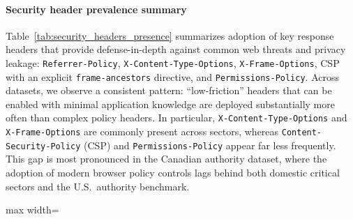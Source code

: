 \documentclass[a4paper,fleqn]{cas-sc}
\begin{document}
\paragraph{Security header prevalence summary}
    Table~\ref{tab:security_headers_presence} summarizes adoption of key response headers that provide defense-in-depth against common web threats and privacy leakage: \texttt{Referrer-Policy}, \texttt{X-Content-Type-Options}, \texttt{X-Frame-Options}, CSP with an explicit \texttt{frame-ancestors} directive, and \texttt{Permissions-Policy}.
    Across datasets, we observe a consistent pattern: ``low-friction'' headers that can be enabled with minimal application knowledge are deployed substantially more often than complex policy headers. 
    In particular, \texttt{X-Content-Type-Options} and \texttt{X-Frame-Options} are commonly present across sectors, whereas \texttt{Content-Security-Policy} (CSP) and \texttt{Permissions-Policy} appear far less frequently. 
    This gap is most pronounced in the Canadian authority dataset, where the adoption of modern browser policy controls lags behind both domestic critical sectors and the U.S.\ authority benchmark.

    \begin{table}[t]
  \caption{Security header adoption by dataset (percent of final URIs).}
  \label{tab:security_headers_presence}
  \centering
  \scriptsize
  \setlength{\tabcolsep}{2.2pt}
  \renewcommand{\arraystretch}{1.15}

  \begin{adjustbox}{max width=\columnwidth}
  \end{adjustbox}
\end{table}
\end{document}
